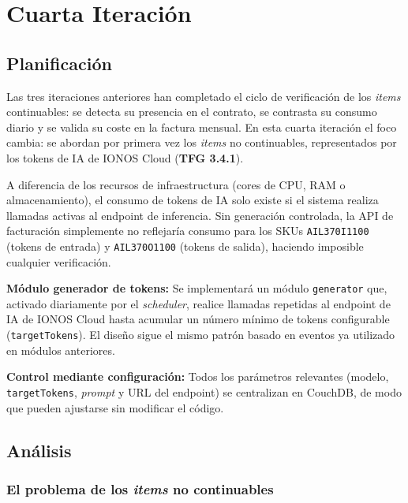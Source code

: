 \section{Cuarta Iteración}

\subsection{Planificación}

Las tres iteraciones anteriores han completado el ciclo de verificación de los \textit{items} continuables: se detecta su presencia en el contrato, se contrasta su consumo diario y se valida su coste en la factura mensual. En esta cuarta iteración el foco cambia: se abordan por primera vez los \textit{items} no continuables, representados por los tokens de IA de IONOS Cloud (\textbf{TFG 3.4.1}).

A diferencia de los recursos de infraestructura (cores de CPU, RAM o almacenamiento), el consumo de tokens de IA solo existe si el sistema realiza llamadas activas al endpoint de inferencia. Sin generación controlada, la API de facturación simplemente no reflejaría consumo para los SKUs \texttt{AIL370I1100} (tokens de entrada) y \texttt{AIL370O1100} (tokens de salida), haciendo imposible cualquier verificación.

\textbf{Módulo generador de tokens:} Se implementará un módulo \texttt{generator} que, activado diariamente por el \textit{scheduler}, realice llamadas repetidas al endpoint de IA de IONOS Cloud hasta acumular un número mínimo de tokens configurable (\texttt{targetTokens}). El diseño sigue el mismo patrón basado en eventos ya utilizado en módulos anteriores.

\textbf{Control mediante configuración:} Todos los parámetros relevantes (modelo, \texttt{targetTokens}, \textit{prompt} y URL del endpoint) se centralizan en CouchDB, de modo que pueden ajustarse sin modificar el código.

\subsection{Análisis}

\subsubsection{El problema de los \textit{items} no continuables}

